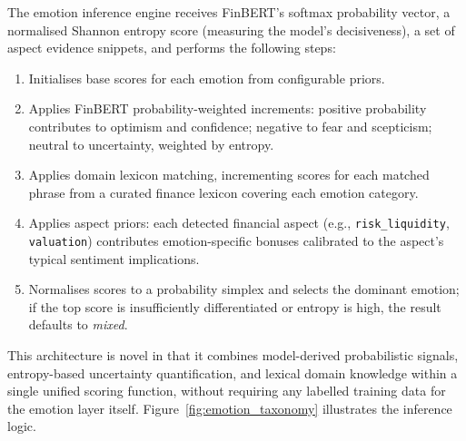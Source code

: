 The emotion inference engine receives FinBERT's softmax probability vector, a normalised Shannon entropy score (measuring the model's decisiveness), a set of aspect evidence snippets, and performs the following steps:
\begin{enumerate}
    \item Initialises base scores for each emotion from configurable priors.
    \item Applies FinBERT probability-weighted increments: positive probability contributes to optimism and confidence; negative to fear and scepticism; neutral to uncertainty, weighted by entropy.
    \item Applies domain lexicon matching, incrementing scores for each matched phrase from a curated finance lexicon covering each emotion category.
    \item Applies aspect priors: each detected financial aspect (e.g., \texttt{risk\_liquidity}, \texttt{valuation}) contributes emotion-specific bonuses calibrated to the aspect's typical sentiment implications.
    \item Normalises scores to a probability simplex and selects the dominant emotion; if the top score is insufficiently differentiated or entropy is high, the result defaults to \textit{mixed}.
\end{enumerate}

This architecture is novel in that it combines model-derived probabilistic signals, entropy-based uncertainty quantification, and lexical domain knowledge within a single unified scoring function, without requiring any labelled training data for the emotion layer itself.  Figure~\ref{fig:emotion_taxonomy} illustrates the inference logic.

